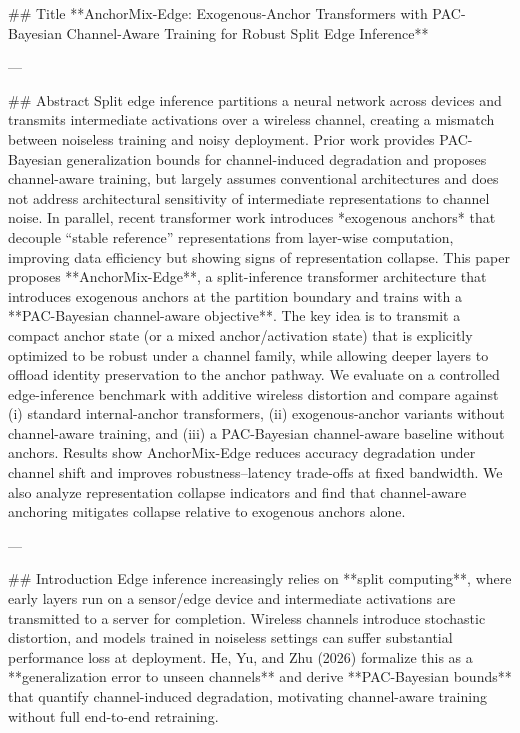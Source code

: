 ## Title  
**AnchorMix-Edge: Exogenous-Anchor Transformers with PAC-Bayesian Channel-Aware Training for Robust Split Edge Inference**

---

## Abstract  
Split edge inference partitions a neural network across devices and transmits intermediate activations over a wireless channel, creating a mismatch between noiseless training and noisy deployment. Prior work provides PAC-Bayesian generalization bounds for channel-induced degradation and proposes channel-aware training, but largely assumes conventional architectures and does not address architectural sensitivity of intermediate representations to channel noise. In parallel, recent transformer work introduces *exogenous anchors* that decouple “stable reference” representations from layer-wise computation, improving data efficiency but showing signs of representation collapse. This paper proposes **AnchorMix-Edge**, a split-inference transformer architecture that introduces exogenous anchors at the partition boundary and trains with a **PAC-Bayesian channel-aware objective**. The key idea is to transmit a compact anchor state (or a mixed anchor/activation state) that is explicitly optimized to be robust under a channel family, while allowing deeper layers to offload identity preservation to the anchor pathway. We evaluate on a controlled edge-inference benchmark with additive wireless distortion and compare against (i) standard internal-anchor transformers, (ii) exogenous-anchor variants without channel-aware training, and (iii) a PAC-Bayesian channel-aware baseline without anchors. Results show AnchorMix-Edge reduces accuracy degradation under channel shift and improves robustness–latency trade-offs at fixed bandwidth. We also analyze representation collapse indicators and find that channel-aware anchoring mitigates collapse relative to exogenous anchors alone.

---

## Introduction  
Edge inference increasingly relies on **split computing**, where early layers run on a sensor/edge device and intermediate activations are transmitted to a server for completion. Wireless channels introduce stochastic distortion, and models trained in noiseless settings can suffer substantial performance loss at deployment. He, Yu, and Zhu (2026) formalize this as a **generalization error to unseen channels** and derive **PAC-Bayesian bounds** that quantify channel-induced degradation, motivating channel-aware training without full end-to-end retraining.


